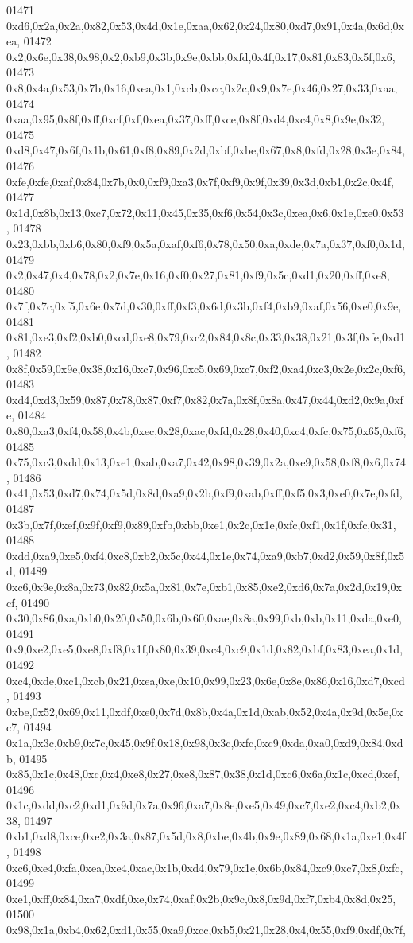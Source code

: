 \begin{DoxyCode}
01471   0xd6,0x2a,0x2a,0x82,0x53,0x4d,0x1e,0xaa,0x62,0x24,0x80,0xd7,0x91,0x4a,0x6d,0xea,
01472   0x2,0x6e,0x38,0x98,0x2,0xb9,0x3b,0x9e,0xbb,0xfd,0x4f,0x17,0x81,0x83,0x5f,0x6,
01473   0x8,0x4a,0x53,0x7b,0x16,0xea,0x1,0xcb,0xcc,0x2c,0x9,0x7e,0x46,0x27,0x33,0xaa,
01474   0xaa,0x95,0x8f,0xff,0xcf,0xf,0xea,0x37,0xff,0xce,0x8f,0xd4,0xc4,0x8,0x9e,0x32,
01475   0xd8,0x47,0x6f,0x1b,0x61,0xf8,0x89,0x2d,0xbf,0xbe,0x67,0x8,0xfd,0x28,0x3e,0x84,
01476   0xfe,0xfe,0xaf,0x84,0x7b,0x0,0xf9,0xa3,0x7f,0xf9,0x9f,0x39,0x3d,0xb1,0x2c,0x4f,
01477   0x1d,0x8b,0x13,0xc7,0x72,0x11,0x45,0x35,0xf6,0x54,0x3c,0xea,0x6,0x1e,0xe0,0x53,
01478   0x23,0xbb,0xb6,0x80,0xf9,0x5a,0xaf,0xf6,0x78,0x50,0xa,0xde,0x7a,0x37,0xf0,0x1d,
01479   0x2,0x47,0x4,0x78,0x2,0x7e,0x16,0xf0,0x27,0x81,0xf9,0x5c,0xd1,0x20,0xff,0xe8,
01480   0x7f,0x7c,0xf5,0x6e,0x7d,0x30,0xff,0xf3,0x6d,0x3b,0xf4,0xb9,0xaf,0x56,0xe0,0x9e,
01481   0x81,0xe3,0xf2,0xb0,0xcd,0xe8,0x79,0xc2,0x84,0x8c,0x33,0x38,0x21,0x3f,0xfe,0xd1,
01482   0x8f,0x59,0x9e,0x38,0x16,0xc7,0x96,0xc5,0x69,0xc7,0xf2,0xa4,0xc3,0x2e,0x2c,0xf6,
01483   0xd4,0xd3,0x59,0x87,0x78,0x87,0xf7,0x82,0x7a,0x8f,0x8a,0x47,0x44,0xd2,0x9a,0xfe,
01484   0x80,0xa3,0xf4,0x58,0x4b,0xec,0x28,0xac,0xfd,0x28,0x40,0xc4,0xfc,0x75,0x65,0xf6,
01485   0x75,0xc3,0xdd,0x13,0xe1,0xab,0xa7,0x42,0x98,0x39,0x2a,0xe9,0x58,0xf8,0x6,0x74,
01486   0x41,0x53,0xd7,0x74,0x5d,0x8d,0xa9,0x2b,0xf9,0xab,0xff,0xf5,0x3,0xe0,0x7e,0xfd,
01487   0x3b,0x7f,0xef,0x9f,0xf9,0x89,0xfb,0xbb,0xe1,0x2c,0x1e,0xfc,0xf1,0x1f,0xfc,0x31,
01488   0xdd,0xa9,0xe5,0xf4,0xc8,0xb2,0x5c,0x44,0x1e,0x74,0xa9,0xb7,0xd2,0x59,0x8f,0x5d,
01489   0xc6,0x9e,0x8a,0x73,0x82,0x5a,0x81,0x7e,0xb1,0x85,0xe2,0xd6,0x7a,0x2d,0x19,0xcf,
01490   0x30,0x86,0xa,0xb0,0x20,0x50,0x6b,0x60,0xae,0x8a,0x99,0xb,0xb,0x11,0xda,0xe0,
01491   0x9,0xe2,0xe5,0xe8,0xf8,0x1f,0x80,0x39,0xc4,0xc9,0x1d,0x82,0xbf,0x83,0xea,0x1d,
01492   0xc4,0xde,0xc1,0xcb,0x21,0xea,0xe,0x10,0x99,0x23,0x6e,0x8e,0x86,0x16,0xd7,0xcd,
01493   0xbe,0x52,0x69,0x11,0xdf,0xe0,0x7d,0x8b,0x4a,0x1d,0xab,0x52,0x4a,0x9d,0x5e,0xc7,
01494   0x1a,0x3c,0xb9,0x7c,0x45,0x9f,0x18,0x98,0x3c,0xfc,0xc9,0xda,0xa0,0xd9,0x84,0xdb,
01495   0x85,0x1c,0x48,0xc,0x4,0xe8,0x27,0xe8,0x87,0x38,0x1d,0xc6,0x6a,0x1c,0xcd,0xef,
01496   0x1c,0xdd,0xc2,0xd1,0x9d,0x7a,0x96,0xa7,0x8e,0xe5,0x49,0xc7,0xe2,0xc4,0xb2,0x38,
01497   0xb1,0xd8,0xce,0xe2,0x3a,0x87,0x5d,0x8,0xbe,0x4b,0x9e,0x89,0x68,0x1a,0xe1,0x4f,
01498   0xc6,0xe4,0xfa,0xea,0xe4,0xac,0x1b,0xd4,0x79,0x1e,0x6b,0x84,0xc9,0xc7,0x8,0xfc,
01499   0xe1,0xff,0x84,0xa7,0xdf,0xe,0x74,0xaf,0x2b,0x9c,0x8,0x9d,0xf7,0xb4,0x8d,0x25,
01500   0x98,0x1a,0xb4,0x62,0xd1,0x55,0xa9,0xcc,0xb5,0x21,0x28,0x4,0x55,0xf9,0xdf,0x7f,

\end{DoxyCode}
